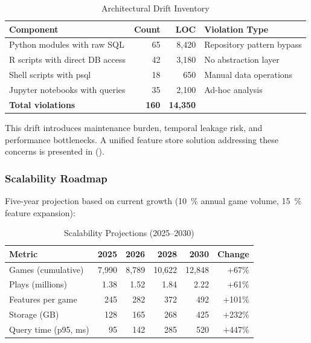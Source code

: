 \begin{table}[htbp]
\centering
\caption{Architectural Drift Inventory}
\label{tab:architectural_drift}
\begin{tabular}{@{}lrrp{4cm}@{}}
\toprule
\textbf{Component} & \textbf{Count} & \textbf{LOC} & \textbf{Violation Type} \\
\midrule
Python modules with raw SQL & 65 & 8,420 & Repository pattern bypass \\
R scripts with direct DB access & 42 & 3,180 & No abstraction layer \\
Shell scripts with psql & 18 & 650 & Manual data operations \\
Jupyter notebooks with queries & 35 & 2,100 & Ad-hoc analysis \\
\midrule
\textbf{Total violations} & \textbf{160} & \textbf{14,350} & \\
\bottomrule
\end{tabular}
\end{table}

This drift introduces maintenance burden, temporal leakage risk, and performance bottlenecks. A unified feature store solution addressing these concerns is presented in  ().

\subsubsection{Scalability Roadmap}

Five-year projection based on current growth (\SI{10}{\percent} annual game volume, \SI{15}{\percent} feature expansion):

\begin{table}[htbp]
\centering
\caption{Scalability Projections (2025--2030)}
\label{tab:scalability_projections}
\begin{tabular}{@{}lrrrrr@{}}
\toprule
\textbf{Metric} & \textbf{2025} & \textbf{2026} & \textbf{2028} & \textbf{2030} & \textbf{Change} \\
\midrule
Games (cumulative) & 7,990 & 8,789 & 10,622 & 12,848 & +67\% \\
Plays (millions) & 1.38 & 1.52 & 1.84 & 2.22 & +61\% \\
Features per game & 245 & 282 & 372 & 492 & +101\% \\
Storage (GB) & 128 & 165 & 268 & 425 & +232\% \\
Query time (p95, ms) & 95 & 142 & 285 & 520 & +447\% \\
\bottomrule
\end{tabular}
\end{table}

